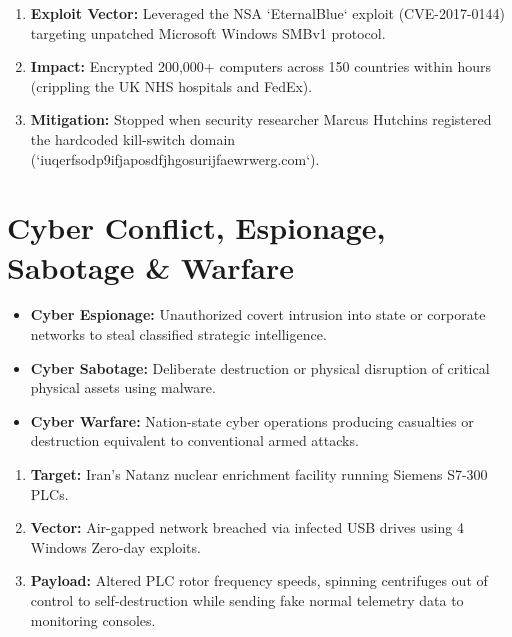 \documentclass[12pt,a4paper]{article}
\begin{document}
\begin{tcolorbox}[examplebox, title={\textbf{Real-World Case Study: WannaCry Ransomware Pandemic (2017)}}]
\begin{enumerate}[leftmargin=*, itemsep=3pt]
  \item \textbf{Exploit Vector:} Leveraged the NSA `EternalBlue` exploit (CVE-2017-0144) targeting unpatched Microsoft Windows SMBv1 protocol.
  \item \textbf{Impact:} Encrypted 200,000+ computers across 150 countries within hours (crippling the UK NHS hospitals and FedEx).
  \item \textbf{Mitigation:} Stopped when security researcher Marcus Hutchins registered the hardcoded kill-switch domain (`iuqerfsodp9ifjaposdfjhgosurijfaewrwerg.com`).
\end{enumerate}
\end{tcolorbox}

\section{Cyber Conflict, Espionage, Sabotage \& Warfare}

\begin{tcolorbox}[defbox, title={\textbf{Definition: Cyber Warfare, Espionage \& Sabotage}}]
\begin{itemize}[leftmargin=*, itemsep=3pt]
  \item \textbf{Cyber Espionage:} Unauthorized covert intrusion into state or corporate networks to steal classified strategic intelligence.
  \item \textbf{Cyber Sabotage:} Deliberate destruction or physical disruption of critical physical assets using malware.
  \item \textbf{Cyber Warfare:} Nation-state cyber operations producing casualties or destruction equivalent to conventional armed attacks.
\end{itemize}
\end{tcolorbox}

\begin{tcolorbox}[examplebox, title={\textbf{Historical Case Study: Stuxnet Natanz Centrifuge Sabotage (2010)}}]
\begin{enumerate}[leftmargin=*, itemsep=3pt]
  \item \textbf{Target:} Iran's Natanz nuclear enrichment facility running Siemens S7-300 PLCs.
  \item \textbf{Vector:} Air-gapped network breached via infected USB drives using 4 Windows Zero-day exploits.
  \item \textbf{Payload:} Altered PLC rotor frequency speeds, spinning centrifuges out of control to self-destruction while sending fake normal telemetry data to monitoring consoles.
\end{enumerate}
\end{tcolorbox}
\end{document}
